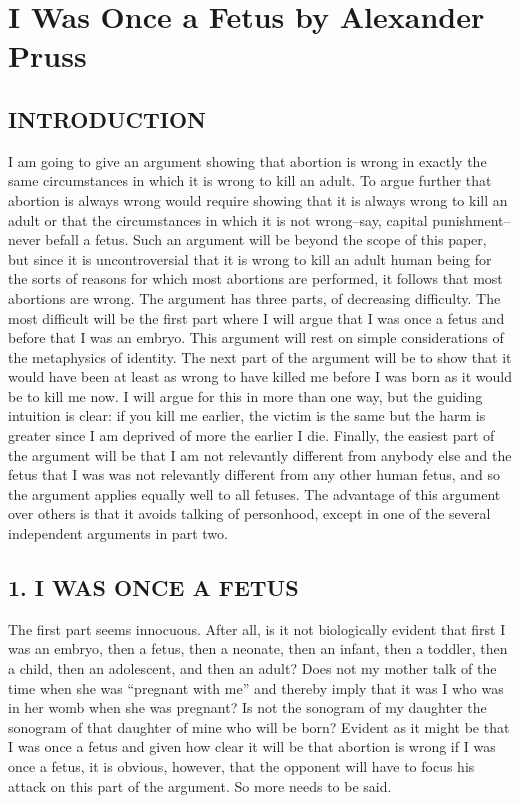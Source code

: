 \chapter{I Was Once a Fetus by Alexander Pruss}\autocite{Pruss1}

\section{INTRODUCTION}
 
I am going to give an argument showing that abortion is wrong in exactly 
the same circumstances in which it is wrong to kill an adult.  To argue 
further that abortion is always wrong would require showing that it is 
always wrong to kill an adult or that the circumstances in which it is not 
wrong–say, capital punishment–never befall a fetus.  Such an argument 
will be beyond the scope of this paper, but since it is uncontroversial that 
it is wrong to kill an adult human being for the sorts of reasons for which 
most abortions are performed, it follows that most abortions are wrong. 
The argument has three parts, of decreasing difficulty.  The most 
difficult will be the first part where I will argue that I was once a fetus 
and  before  that  I  was  an  embryo.    This  argument  will  rest  on  simple 
considerations  of  the  metaphysics  of  identity.    The  next  part  of  the 
argument will be to show that it would have been at least as wrong to 
have killed me before I was born as it would be to kill me now.  I will 
argue for this in more than one way, but the guiding intuition is clear: if 
you kill me earlier, the victim is the same but the harm is greater since I 
am  deprived  of  more  the  earlier  I  die.    Finally,  the  easiest  part  of  the 
argument will be that I am not relevantly different from anybody else and 
the fetus that I was was not relevantly different from any other human 
fetus, and so the argument applies equally well to all fetuses. 
The advantage of this argument over others is that it avoids talking 
of personhood, except in one of the several independent arguments in 
part two. 
 
 
\section{1. I WAS ONCE A FETUS} 
The first part seems innocuous.  After all, is it not biologically evident 
that first I was an embryo, then a fetus, then a neonate, then an infant, 
then a toddler, then a child, then an adolescent, and then an adult?  Does 
not my mother talk of the time when she was “pregnant with me” and 
thereby  imply  that  it  was  I  who  was  in  her  womb  when  she  was 
pregnant?    Is  not  the  sonogram  of  my  daughter  the  sonogram  of  that 
daughter of mine who will be born?  Evident as it might be that I was 
once a fetus and given how clear it will be that abortion is wrong if I was 
once a fetus, it is obvious, however, that the opponent will have to focus 
his attack on this part of the argument.  So more needs to be said. 


